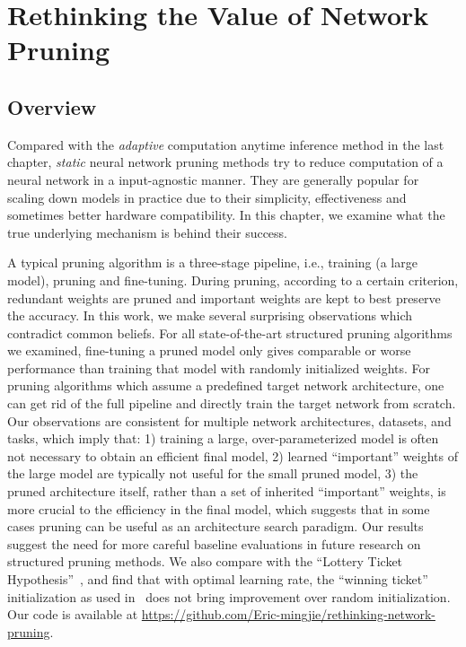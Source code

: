 \chapter{Rethinking the Value of Network Pruning}
\label{chap:rethink}

\section{Overview}
Compared with the \emph{adaptive} computation anytime inference method in the last chapter, \emph{static} neural network pruning methods try to reduce computation of a neural network in a input-agnostic manner. They are generally popular for scaling down models in practice due to their simplicity, effectiveness and sometimes better hardware compatibility. In this chapter, we examine what the true underlying mechanism is behind their success. 

A typical pruning algorithm is a three-stage pipeline, i.e., training (a large model), pruning and fine-tuning. During pruning, according to a certain criterion, redundant weights are pruned and important weights are kept to best preserve the accuracy. In this work, we make several surprising observations which contradict common beliefs. For all state-of-the-art structured pruning algorithms we examined, fine-tuning a pruned model only gives comparable or worse performance than training that model with randomly initialized weights. 
For pruning algorithms which assume a predefined target network architecture, one can get rid of the full pipeline and directly train the target network from scratch.
Our observations are consistent for multiple network architectures, datasets, and tasks, which imply that: 1) training a large, over-parameterized model is often not necessary to obtain an efficient final model, 2) learned ``important'' weights of the large model are typically not useful for the small pruned model, 3) the pruned architecture itself, rather than a set of inherited ``important'' weights, is more crucial to the efficiency in the final model, which suggests that in some cases pruning can be useful as an architecture search paradigm.
Our results suggest the need for more careful baseline evaluations in future research on structured pruning methods. 
We also compare with the ``Lottery Ticket Hypothesis''~\cite{lottery}, and find that with optimal learning rate, the ``winning ticket'' initialization as used in~\cite{lottery} does not bring improvement over random initialization. Our code is available at \url{https://github.com/Eric-mingjie/rethinking-network-pruning}.


